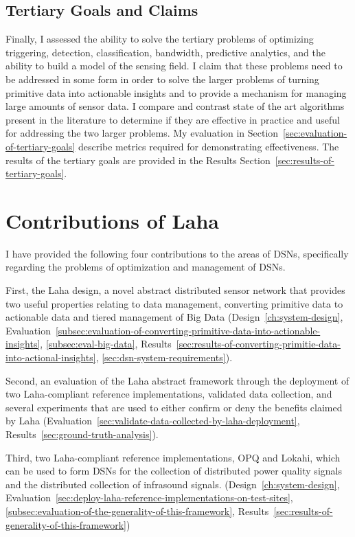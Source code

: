 \subsection{Tertiary Goals and Claims}\label{subsec:tertiary-goals-and-claims}
Finally, I assessed the ability to solve the tertiary problems of optimizing triggering, detection, classification, bandwidth, predictive analytics, and the ability to build a model of the sensing field. I claim that these problems need to be addressed in some form in order to solve the larger problems of turning primitive data into actionable insights and to provide a mechanism for managing large amounts of sensor data. I compare and contrast state of the art algorithms present in the literature to determine if they are effective in practice and useful for addressing the two larger problems. My evaluation in Section~\ref{sec:evaluation-of-tertiary-goals} describe metrics required for demonstrating effectiveness. The results of the tertiary goals are provided in the Results Section~\ref{sec:results-of-tertiary-goals}.

\section{Contributions of Laha}\label{subsec:anticipated-contributions}
I have provided the following four contributions to the areas of DSNs, specifically regarding the problems of optimization and management of DSNs.

First, the Laha design, a novel abstract distributed sensor network that provides two useful properties relating to data management, converting primitive data to actionable data and tiered management of Big Data (Design~\ref{ch:system-design}, Evaluation~\ref{subsec:evaluation-of-converting-primitive-data-into-actionable-insights}, \ref{subsec:eval-big-data}, Results~\ref{sec:results-of-converting-primitie-data-into-actional-insights}, \ref{sec:dsn-system-requirements}).

Second, an evaluation of the Laha abstract framework through the deployment of two Laha-compliant reference implementations, validated data collection, and several experiments that are used to either confirm or deny the benefits claimed by Laha (Evaluation~\ref{sec:validate-data-collected-by-laha-deployment}, Results~\ref{sec:ground-truth-analysis}).

Third, two Laha-compliant reference implementations, OPQ and Lokahi, which can be used to form DSNs for the collection of distributed power quality signals and the distributed collection of infrasound signals. (Design~\ref{ch:system-design}, Evaluation~\ref{sec:deploy-laha-reference-implementations-on-test-sites}, \ref{subsec:evaluation-of-the-generality-of-this-framework}, Results~\ref{sec:results-of-generality-of-this-framework})

